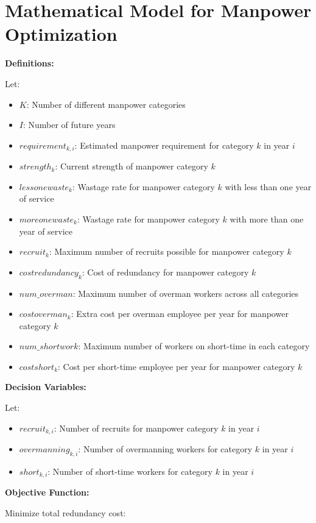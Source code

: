 \documentclass{article}
\begin{document}
\section*{Mathematical Model for Manpower Optimization}

\textbf{Definitions:}

Let:
\begin{itemize}
    \item $K$: Number of different manpower categories
    \item $I$: Number of future years
    \item $requirement_{k,i}$: Estimated manpower requirement for category $k$ in year $i$
    \item $strength_k$: Current strength of manpower category $k$
    \item $lessonewaste_k$: Wastage rate for manpower category $k$ with less than one year of service
    \item $moreonewaste_k$: Wastage rate for manpower category $k$ with more than one year of service
    \item $recruit_k$: Maximum number of recruits possible for manpower category $k$
    \item $costredundancy_k$: Cost of redundancy for manpower category $k$
    \item $num\_overman$: Maximum number of overman workers across all categories
    \item $costoverman_k$: Extra cost per overman employee per year for manpower category $k$
    \item $num\_shortwork$: Maximum number of workers on short-time in each category
    \item $costshort_k$: Cost per short-time employee per year for manpower category $k$
\end{itemize}

\textbf{Decision Variables:}

Let:
\begin{itemize}
    \item $recruit_{k,i}$: Number of recruits for manpower category $k$ in year $i$
    \item $overmanning_{k,i}$: Number of overmanning workers for category $k$ in year $i$
    \item $short_{k,i}$: Number of short-time workers for category $k$ in year $i$
\end{itemize}

\textbf{Objective Function:}

Minimize total redundancy cost:
\end{document}
